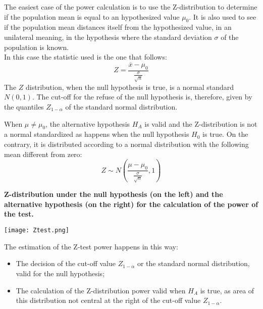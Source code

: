 \begin{frame}
  \vspace*{.25cm}
  The easiest case of the power calculation is to use the Z-distribution to determine if the population mean is equal to an hypothesized value $\mu_0$. It is also used to see if the population mean distances itself from the hypothesized value, in an unilateral meaning, in the hypothesis where the standard deviation $\sigma$ of the population is known.\\
  \vspace*{.25cm}
  In this case the statistic used is the one that follows:
  $$ Z = \frac{\overline{x}-\mu_0}{\frac{\sigma}{\sqrt{n}}} $$
  The $ Z $ distribution, when the null hypothesis is true, is a normal standard $ N(0,1) $. The cut-off for the refuse of the null hypothesis is, therefore, given by the quantiles $Z_{1-\alpha}$ of the standard normal distribution.\\
\end{frame}

\begin{frame}
  \vspace*{.5cm}
  When $\mu\neq\mu_0$, the alternative hypothesis $ H_A $ is valid and the Z-distribution is not a normal standardized as happens when the null hypothesis $H_0$ is true. On the contrary, it is distributed according to a normal distribution with the following mean different from zero:\\
  \vspace*{.5cm}
  $$Z\sim N\left( \frac{\mu-\mu_0}{\frac{\sigma}{\sqrt{n}}},1\right) $$
\end{frame}

\begin{frame}
  \begin{small}
    \textbf{Z-distribution under the null hypothesis (on the left) and the alternative hypothesis (on the right) for the calculation of the power of the test.}
  \end{small}
  \begin{center}
    \texttt{[image: Ztest.png]}
  \end{center}
\end{frame}

\begin{frame}
  \vspace*{.5cm}
  The estimation of the Z-test power happens in this way:
  \vspace*{.25cm}
  \begin{itemize}
    \item The decision of the cut-off value $Z_{1-\alpha}$ or the standard normal distribution, valid for the null hypothesis;
    \item The calculation of the Z-distribution power valid when $ H_A $ is true, as area of this distribution not central at the right of the cut-off value $Z_{1-\alpha}$.
  \end{itemize}
\end{frame}

